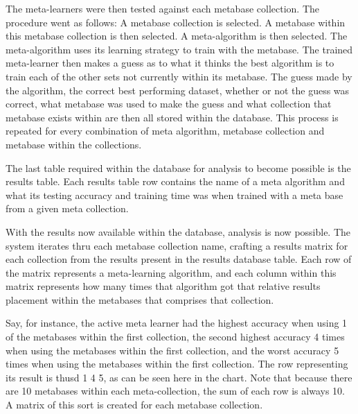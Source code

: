 The meta-learners were then tested against each metabase collection. The procedure
went as follows: A metabase collection is selected. A metabase within this
metabase collection is then selected. A meta-algorithm is then selected. The
meta-algorithm uses its learning strategy to train with the metabase. The
trained meta-learner then makes a guess as to what it thinks the best algorithm
is to train each of the other sets not currently within its metabase. The guess
made by the algorithm, the correct best performing dataset, whether or not the
guess was correct, what metabase was used to make the guess and what collection
that metabase exists within are then all stored within the database. This
process is repeated for every combination of meta algorithm, metabase collection
and metabase within the collections.

The last table required within the database for analysis to become possible
is the results table. Each results table row contains the name of a meta
algorithm and what its testing accuracy and training time was when trained
with a meta base from a given meta collection.

With the results now available within the database, analysis is now possible.
The system iterates thru each metabase collection name, crafting a results
matrix for each collection from the results present in the results
database table. Each row of the matrix represents a meta-learning
algorithm, and each column within this matrix represents how many times
that algorithm got that relative results placement within the metabases that
comprises that collection.


Say, for instance, the active meta learner had the highest accuracy when using 1
of the metabases within the first collection, the second highest accuracy 4
times when using the metabases within the first collection, and the worst
accuracy 5 times when using the metabases within the first collection.
The row representing its result is thusd  1 4 5, as can be seen
here in the chart. Note that because there are 10 metabases within each
meta-collection, the sum of each row is always 10. A matrix of this sort is
created for each metabase collection.

